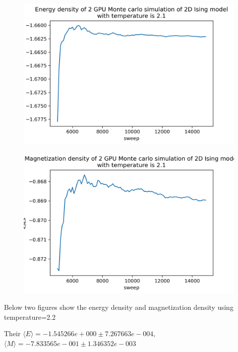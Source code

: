 \documentclass{article}
\begin{document}
	\begin{figure}[hb!]
		\centering
		\includegraphics[width=0.7\linewidth]{notebook/2gpu_2.1_E}
	\end{figure}
	\begin{figure}[hb!]
		\centering
		\includegraphics[width=0.7\linewidth]{notebook/2gpu_2.1_M}
	\end{figure}
	\newpage
	
	Below two figures show the energy density and magnetization density using temperature=2.2

	Their $\langle E\rangle = -1.545266e+000 \pm 7.267663e-004$, $\langle M\rangle = -7.833565e-001 \pm 1.346352e-003$
\end{document}
